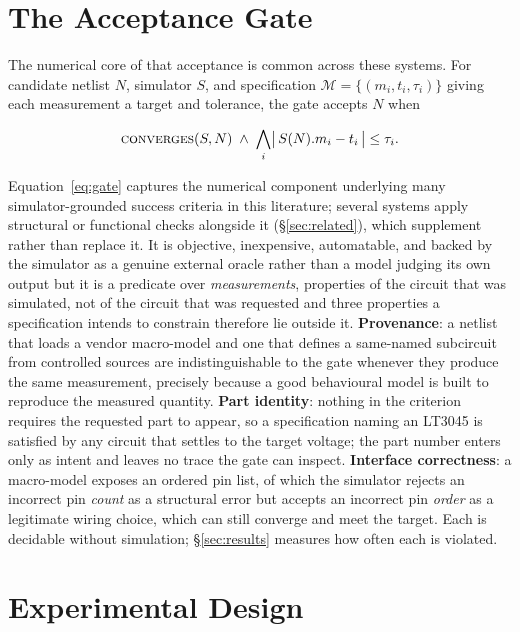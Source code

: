 \section{The Acceptance Gate}
\label{sec:gate}

The numerical core of that acceptance is common across these systems. For
candidate netlist $N$,
simulator $S$, and specification $\mathcal{M} = \{(m_i, t_i, \tau_i)\}$ giving
each measurement a target and tolerance, the gate accepts $N$ when

\begin{equation}
\label{eq:gate}
\textsc{converges}(S, N) \;\wedge\; \bigwedge_i \bigl| \, S(N).m_i - t_i \, \bigr| \le \tau_i .
\end{equation}

Equation~\ref{eq:gate} captures the numerical component underlying many
simulator-grounded success criteria in this literature; several systems apply
structural or functional checks alongside it (\S\ref{sec:related}), which
supplement rather than replace it. It is objective, inexpensive, automatable, and
backed by the simulator as a genuine external oracle rather than a model
judging its own output but it is a predicate over
\emph{measurements}, properties of the circuit that was simulated, not of
the circuit that was requested and three properties a specification intends
to constrain therefore lie outside it. \textbf{Provenance}: a netlist that
loads a vendor macro-model and one that defines a same-named subcircuit from
controlled sources are indistinguishable to the gate whenever they produce
the same measurement, precisely because a good behavioural model is built to
reproduce the measured quantity. \textbf{Part identity}: nothing in the
criterion requires the requested part to appear, so a specification naming an
LT3045 is satisfied by any circuit that settles to the target voltage; the
part number enters only as intent and leaves no trace the gate can inspect.
\textbf{Interface correctness}: a macro-model exposes an ordered pin list, of
which the simulator rejects an incorrect pin \emph{count} as a structural
error but accepts an incorrect pin \emph{order} as a legitimate wiring
choice, which can still converge and meet the target. Each is decidable
without simulation; \S\ref{sec:results} measures how often each is violated.

\section{Experimental Design}
\label{sec:design}

